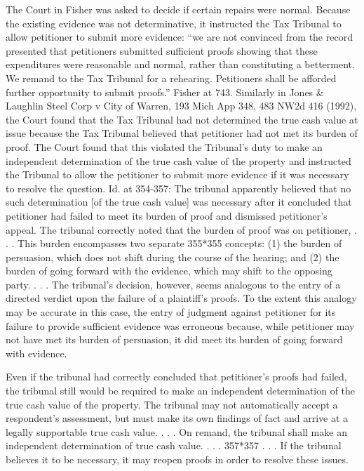 \documentclass[12pt,\documentclassflag]{michiganCourtOfAppealsBrief}
\begin{document}
The Court in Fisher was asked to decide if certain repairs were normal. Because the existing evidence was not determinative, it instructed the Tax Tribunal to allow petitioner to submit more evidence: ``we are not convinced from the record presented that petitioners submitted sufficient proofs showing that these expenditures were reasonable and normal, rather than constituting a betterment. We remand to the Tax Tribunal for a rehearing. Petitioners shall be afforded further opportunity to submit proofs.'' Fisher at 743. 
Similarly in Jones & Laughlin Steel Corp v City of Warren, 193 Mich App 348, 483 NW2d 416 (1992), the Court found that the Tax Tribunal had not determined the true cash value at issue because the Tax Tribunal believed that petitioner had not met its burden of proof. The Court found that this violated the Tribunal's duty to make an independent determination of the true cash value of the property and instructed the Tribunal to allow the petitioner to submit more evidence if it was necessary to resolve the question. Id. at 354-357:
The tribunal apparently believed that no such determination [of the true cash value] was necessary after it concluded that petitioner had failed to meet its burden of proof and dismissed petitioner's appeal. The tribunal correctly noted that the burden of proof was on petitioner, . . .  This burden encompasses two separate 355*355 concepts: (1) the burden of persuasion, which does not shift during the course of the hearing; and (2) the burden of going forward with the evidence, which may shift to the opposing party. . . . The tribunal's decision, however, seems analogous to the entry of a directed verdict upon the failure of a plaintiff's proofs. To the extent this analogy may be accurate in this case, the entry of judgment against petitioner for its failure to provide sufficient evidence was erroneous because, while petitioner may not have met its burden of persuasion, it did meet its burden of going forward with evidence.
 
Even if the tribunal had correctly concluded that petitioner's proofs had failed, the tribunal still would be required to make an independent determination of the true cash value of the property. The tribunal may not automatically accept a respondent's assessment, but must make its own findings of fact and arrive at a legally supportable true cash value. . . . On remand, the tribunal shall make an independent determination of true cash value. . . . 357*357 . . . If the tribunal believes it to be necessary, it may reopen proofs in order to resolve these issues.
 
\end{document}
